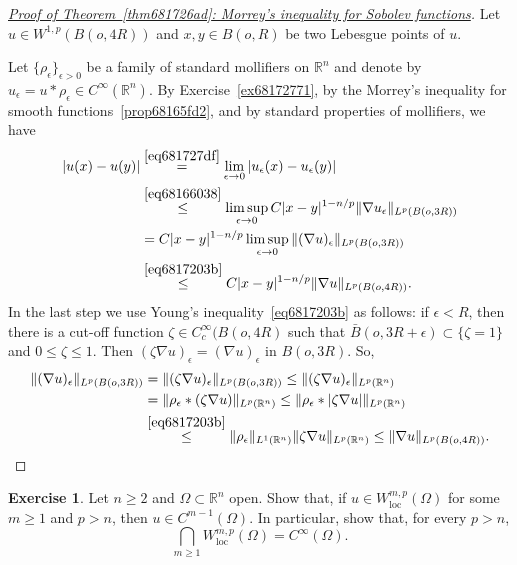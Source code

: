 \documentclass[a4paper,9pt]{amsart}
\newcommand{\R}{\mathbb{R}}	%
\newcommand{\loc}{\mathrm{loc}}
\newcommand{\grad}{\nabla}
\theoremstyle{plain}
\theoremstyle{definition}
\newtheorem{exercise}[proposition]{Exercise}%
\theoremstyle{remark}
\begin{document}
\begin{proof}[\underline{Proof of Theorem~\ref{thm681726ad}: Morrey's inequality for Sobolev functions}]
	Let $u\in W^{1,p}(B(o,4R))$ and $x,y\in B(o,R)$ be two Lebesgue points of $u$.

	Let $\{\rho_\epsilon\}_{\epsilon>0}$ be a family of standard mollifiers on $\R^n$
	and denote by $u_\epsilon = u*\rho_\epsilon \in C^\infty(\R^n)$.
	By Exercise~\ref{ex68172771}, by the Morrey's inequality for smooth functions~\ref{prop68165fd2}, 
	and by standard properties of mollifiers, 
	we have
	\begin{align}
		|u(x)-u(y)|
		&\overset{\eqref{eq681727df}}= \lim_{\epsilon\to0} |u_\epsilon(x) - u_\epsilon(y)| \\
		&\overset{\eqref{eq68166038}}\le \limsup_{\epsilon\to0}  C |x-y|^{1-n/p} \|\grad u_\epsilon\|_{L^p(B(o,3R))} \\
		&= C |x-y|^{1-n/p} \limsup_{\epsilon\to0}\|(\grad u)_\epsilon\|_{L^p(B(o,3R))} \\
		&\overset{\eqref{eq6817203b}}\le C |x-y|^{1-n/p} \|\grad u\|_{L^p(B(o,4R))} .
	\end{align}
	In the last step we use Young's inequality~\eqref{eq6817203b} as follows:
	if $\epsilon<R$, then there is a cut-off function $\zeta\in C^\infty_c(B(o,4R)$ such that $\bar B(o,3R+\epsilon) \subset \{\zeta=1\}$ and $0\le \zeta\le 1$.
	Then $(\zeta\grad u)_\epsilon = (\grad u)_\epsilon$ in $B(o,3R)$.
	So,
	\begin{align}
		\|(\grad u)_\epsilon\|_{L^p(B(o,3R))} 
		&= \|(\zeta\grad u)_\epsilon\|_{L^p(B(o,3R))}
		\le \|(\zeta\grad u)_\epsilon\|_{L^p(\R^n)} \\
		&= \|\rho_\epsilon*(\zeta\grad u)\|_{L^p(\R^n)} 
		\le \|\rho_\epsilon*|\zeta\grad u|\|_{L^p(\R^n)} \\
		&\overset{\eqref{eq6817203b}}\le \|\rho_\epsilon\|_{L^1(\R^n)} \|\zeta\grad u\|_{L^p(\R^n)} 
		\le \|\grad u\|_{L^p(B(o,4R))} .
	\end{align}
\end{proof}

\begin{exercise}
	Let $n\ge2$ and $\Omega\subset\R^n$ open.
	Show that, if $u\in W^{m,p}_\loc(\Omega)$ for some $m\ge1$ and $p>n$, then $u\in C^{m-1}(\Omega)$.
	In particular, show that, for every $p>n$,
	\begin{equation}
		\bigcap_{m\ge1} W^{m,p}_\loc(\Omega) = C^\infty(\Omega) .
	\end{equation}
\end{exercise}
\end{document}
